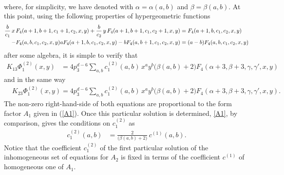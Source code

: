 \documentclass[a4paper,11pt,openright,twoside]{book}
\let\a=\alpha   \let\b=\beta   \let\g=\gamma   \let\d=\delta
\numberwithin{equation}{section}
\begin{document}
{{\begin{align}
\end{align}
where, for simplicity, we have denoted with $\a=\a(a,b)$ and $\b=\b(a,b)$. At this point, using the following properties of  hypergeometric functions \cite{Appell}
\begin{align}
\frac{b}{c_1}\,x\,F_4(a+1,b+1,c_1+1,c_2,x,y)+\frac{b}{c_2}\,y\,F_4(a+1,b+1,c_1,c_2+1,x,y)&=F_4(a+1,b,c_1,c_2,x,y)\notag\\
-F_4(a,b,c_1,c_2,x,y)
aF_4(a+1,b,c_1,c_2,x,y)-bF_4(a,b+1,c_1,c_2,x,y)&=(a-b)F_4(a,b,c_1,c_2,x,y)
\end{align}
after some algebra, it is simple to verify that 
\begin{align}
K_{13}\Phi_1^{(2)}(x,y) &=4p_3^{ d -6} \sum_{a,b} c^{(2)}_1(a,b)\,x^a y^b\big(\b(a,b)+2\big)F_4(\a+3,\b+3,\g,\g',x,y)
\end{align}
and in the same way
\begin{align}
&K_{23}\Phi_1^{(2)}(x,y)= 4p_3^{ d -6} \sum_{a,b} c^{(2)}_1(a,b)\,x^a y^b\big(\b(a,b)+2\big)F_4(\a+3,\b+3,\g,\g',x,y).
\end{align}
The non-zero right-hand-side of both equations are proportional to the form factor $A_1$ given in (\ref{A1}). Once this particular solution is determined, \eqref{A1}, by comparison, gives the conditions on $c_1^{(2)}$ as
\begin{align}
c_1^{(2)}(a,b)&=\frac{2}{\big(\b(a,b)+2\big)}\,c^{(1)}(a,b)\label{condc2}.
\end{align}
Notice that the coefficient $c_1^{(2)}$ of the first particular solution of the inhomogeneous set of equations for $A_2$ is fixed in terms of the coefficient $c^{(1)}$ of homogeneous one of $A_1$.

}}
\end{document}
